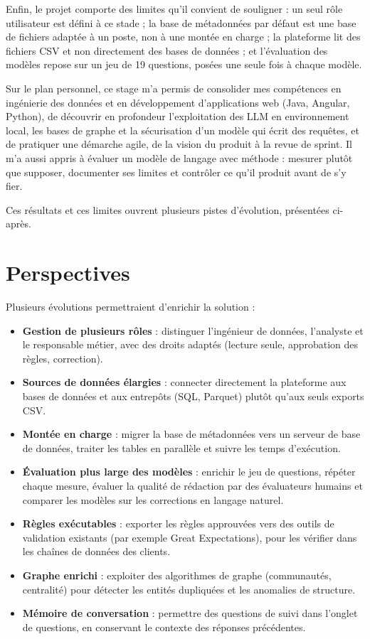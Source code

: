 Enfin, le projet comporte des limites qu'il convient de souligner : un seul rôle utilisateur est défini à ce stade ; la base de métadonnées par défaut est une base de fichiers adaptée à un poste, non à une montée en charge ; la plateforme lit des fichiers CSV et non directement des bases de données ; et l'évaluation des modèles repose sur un jeu de 19 questions, posées une seule fois à chaque modèle.

Sur le plan personnel, ce stage m'a permis de consolider mes compétences en ingénierie des données et en développement d'applications web (Java, Angular, Python), de découvrir en profondeur l'exploitation des LLM en environnement local, les bases de graphe et la sécurisation d'un modèle qui écrit des requêtes, et de pratiquer une démarche agile, de la vision du produit à la revue de sprint. Il m'a aussi appris à évaluer un modèle de langage avec méthode : mesurer plutôt que supposer, documenter ses limites et contrôler ce qu'il produit avant de s'y fier.

Ces résultats et ces limites ouvrent plusieurs pistes d'évolution, présentées ci-après.

\section*{Perspectives}

Plusieurs évolutions permettraient d'enrichir la solution :
\begin{itemize}
  \item \textbf{Gestion de plusieurs rôles} : distinguer l'ingénieur de données, l'analyste et le responsable métier, avec des droits adaptés (lecture seule, approbation des règles, correction).
  \item \textbf{Sources de données élargies} : connecter directement la plateforme aux bases de données et aux entrepôts (SQL, Parquet) plutôt qu'aux seuls exports CSV.
  \item \textbf{Montée en charge} : migrer la base de métadonnées vers un serveur de base de données, traiter les tables en parallèle et suivre les temps d'exécution.
  \item \textbf{Évaluation plus large des modèles} : enrichir le jeu de questions, répéter chaque mesure, évaluer la qualité de rédaction par des évaluateurs humains et comparer les modèles sur les corrections en langage naturel.
  \item \textbf{Règles exécutables} : exporter les règles approuvées vers des outils de validation existants (par exemple Great Expectations), pour les vérifier dans les chaînes de données des clients.
  \item \textbf{Graphe enrichi} : exploiter des algorithmes de graphe (communautés, centralité) pour détecter les entités dupliquées et les anomalies de structure.
  \item \textbf{Mémoire de conversation} : permettre des questions de suivi dans l'onglet de questions, en conservant le contexte des réponses précédentes.
\end{itemize}
